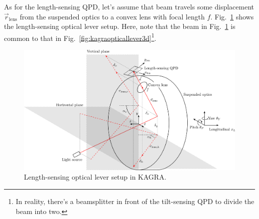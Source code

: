 As for the length-sensing QPD, let's assume that beam travels some displacement $\vec{r}_\mathrm{lens}$ from the suspended optics to a convex lens with focal length $f$. Fig.~\ref{fig:kagralengthopticallever3d} shows the length-sensing optical lever setup.
Here, note that the beam in Fig.~\ref{fig:kagralengthopticallever3d} is common to that in Fig.~\ref{fig:kagraopticallever3d}\footnote{In reality, there's a beamsplitter in front of the tilt-sensing QPD to divide the beam into two.}.
\begin{figure}[!h]
	\centering
	\includegraphics[width=0.7\linewidth]{figures/kagra_length_optical_lever_3d}
	\caption{Length-sensing optical lever setup in KAGRA.}
	\label{fig:kagralengthopticallever3d}
\end{figure}


